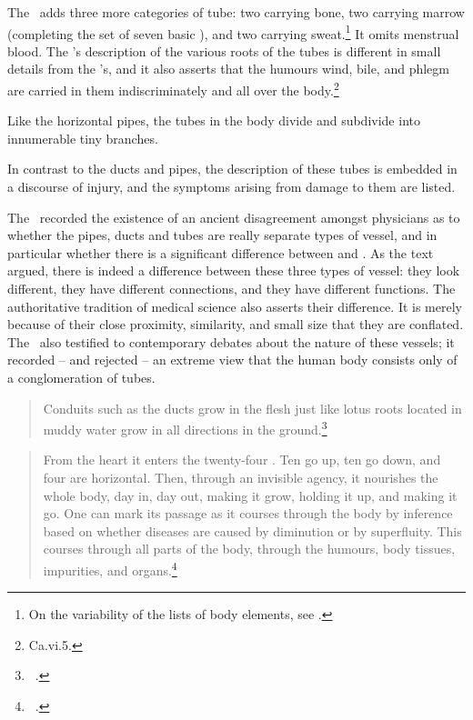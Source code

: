 \begin{refsection}
The \CS\ adds three more categories of tube: two carrying bone, two
carrying marrow (completing the set of seven basic ), and two carrying sweat.\footnote{On the variability of the
    lists of body elements, see \cite[\S4 et passim]{maas-2008}.} It omits
    menstrual blood. The \CS's description of the various roots of the
    tubes is different in small details from the \SS's, and it also
    asserts that the humours wind, bile, and phlegm are carried in them
    indiscriminately and all over the body.\footnote{Ca.vi.5.}

Like the horizontal pipes, the tubes in the body divide and
subdivide into innumerable tiny branches.

In contrast to the ducts and pipes, the description of these tubes is
embedded in a discourse of injury, and the symptoms arising from
damage to them are listed.

The \SS\ recorded the existence of an ancient disagreement amongst
physicians as to whether the pipes, ducts and tubes are really
separate types of vessel, and in particular whether there is a
significant difference between  and
. As the text argued, there is indeed a difference
between these three types of vessel: they look different, they have
different connections, and they have different functions.  The authoritative
tradition of medical science also asserts their difference.  It is
merely because of their close proximity, similarity, and small size
that they are conflated.  The \CS\ also testified to contemporary
debates about the nature of these vessels; it recorded -- and
rejected -- an extreme view that the human body consists only of a
conglomeration of tubes.
\begin{quote}
    Conduits such as the ducts grow in the flesh just like lotus roots
located in muddy water grow in all directions in the
ground.\footnote{\SS\ .}
\end{quote}

\begin{quote}
    From the heart it enters the twenty-four . Ten
go up, ten go down, and four are horizontal.  Then, through an
invisible agency, it nourishes the whole body, day in, day out,
making it grow, holding it up, and making it go.  One can mark its
passage as it courses through the body by inference based on
whether diseases are caused by diminution or by superfluity.  This
 courses through all parts of the body,
through the humours, body tissues, impurities, and
organs.\footnote{\SS\ .}
\end{quote}



\end{refsection}
